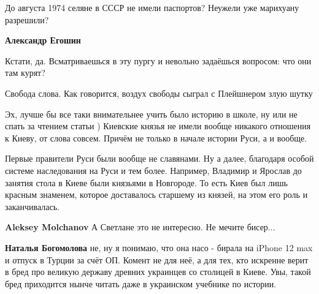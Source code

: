\begin{itemize}
До августа 1974 селяне в СССР не имели паспортов? Неужели уже марихуану разрешили?

 
\textbf{Александр Егошин} 

Кстати, да. Всматриваешься в эту пургу и невольно задаёшься вопросом: что они
там курят?

Свобода слова. Как говорится, воздух свободы сыграл с Плейшнером злую шутку

 

Эх, лучше бы все таки внимательнее учить было историю в школе, ну или не спать
за чтением статьи ) Киевские князья не имели вообще никакого отношения к Киеву,
от слова совсем. Причём не только в начале истории Руси, а и вообще. 

Первые правители Руси были вообще не славянами. Ну а далее, благодаря особой
системе наследования на Руси и тем более. Например, Владимир и Ярослав до
занятия стола в Киеве были князьями в Новгороде. То есть Киев был лишь красным
знаменем, которое доставалось старшему из князей, на этом его роль и
заканчивалась.

\begin{itemize}
 
\textbf{Aleksey Molchanov}
А Светлане это не интересно.
Не мечите бисер...

 
\textbf{Наталья Богомолова} не, ну я понимаю, что она насо - бирала на iPhone 12 max и отпуск в Турции за счёт ОП. Комент не для неё, а для тех, кто искренне верит в бред про великую державу древних украинцев со столицей в Киеве. Увы, такой бред приходится нынче читать даже в украинском учебнике по истории.
\end{itemize}


\end{itemize}
